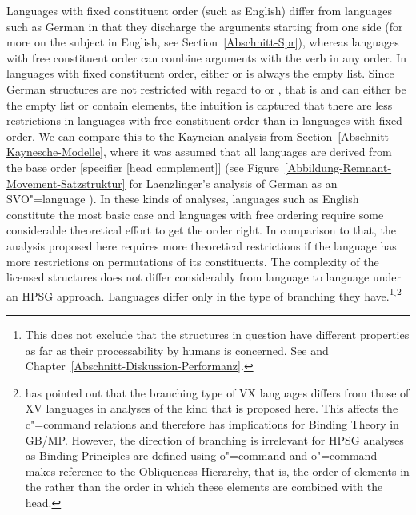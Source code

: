 Languages with fixed constituent order (such as English)
differ from languages such as German in that they discharge the arguments starting from one side (for more on the subject in
English, see Section~\ref{Abschnitt-Spr}), whereas languages with free constituent order can combine arguments with the verb
in any order. In languages with fixed constituent order, either  or  is always the empty list. Since German structures are
not restricted with regard to 
or , that is  and  can either be the empty list or contain elements, the
intuition is captured that there are less restrictions in languages with free constituent order than in languages with fixed order.
We can compare this to the Kayneian analysis from Section~\ref{Abschnitt-Kaynesche-Modelle}, where it was assumed
that all languages are derived from the base order [specifier [head complement]] (see
Figure~\vref{Abbildung-Remnant-Movement-Satzstruktur} for Laenzlinger's analysis of German as an
SVO"=language \citep{Laenzlinger2004a}). In these kinds of analyses, languages such as English constitute the most basic case and languages with
free ordering require some considerable theoretical effort to get the order right. In comparison to that, the analysis proposed here
requires more theoretical restrictions if the language has more restrictions on permutations of its constituents. The complexity of
the licensed structures does not differ considerably from language to language under an HPSG approach. Languages differ only in the type
of branching they have.\footnote{ 
This does not exclude that the structures in question have different properties as far as their
processability by humans is concerned. See  and
  Chapter~\ref{Abschnitt-Diskussion-Performanz}.
}$^,$\footnote{%
\citet[]{Haider97c} has pointed out that the branching type of VX languages differs from
those of XV languages in analyses of the kind that is proposed here. This affects the c"=command
relations and therefore has implications for Binding Theory in GB/MP. However, the direction of branching is irrelevant for HPSG analyses as
Binding Principles are defined using o"=command \citep[Chapter~6]{ps2} and o"=command makes reference to the Obliqueness 
Hierarchy, that is, the order of elements in the \subcatl rather than the order in which these elements are combined with the head.
}

